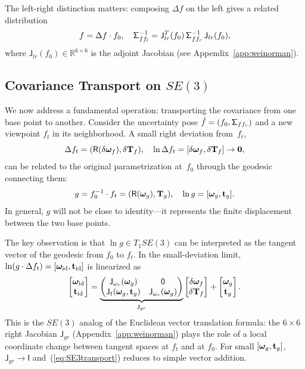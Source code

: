 \documentclass[journal]{IEEEtran}
\newcommand{\real}{\mathbb{R}}
\newcommand{\bfomega}{\boldsymbol{\omega}}
\newcommand{\sfSigma}[1]{\mathsf{\Sigma}_\mathnormal{#1}}
\newcommand{\beq}{\begin{equation}}
\newcommand{\eeq}{\end{equation}}
\begin{document}
The left-right distinction matters: composing 
$\Delta f$ on the left gives a related distribution
\beq
    f = \Delta f \cdot f_0,\quad
    \sfSigma{ff_l}^{-1} = \mathsf{J}_{lr}^T(f_0)\,
    \sfSigma{ff_r}^{-1}\, \mathsf{J}_{lr}(f_0),
    \label{eq:leftright}
\eeq
where $\mathsf{J}_{lr}(f_0) \in \real^{6 \times 6}$ is the 
adjoint Jacobian (see Appendix~\ref{app:weinorman}).

\subsection{Covariance Transport on $SE(3)$}
\label{subsec:covtransport}

We now address a fundamental operation: transporting
the covariance from one base point to another.
Consider the uncertainty pose $\hat{f} = (f_0, \sfSigma{ff_r})$
and a new viewpoint $f_t$ in its neighborhood.
A small right deviation from~$f_t$,
\beq
    \Delta f_t = (\mathsf{R}(\delta\bfomega_f), \delta{\bf T}_f),
    \quad \ln\Delta f_t = [\delta\bfomega_f, \delta{\bf T}_f] \to {\bf 0},
    \label{eq:rightdeviation}
\eeq
can be related to the original parametrization at~$f_0$
through the geodesic connecting them:
\beq
    g = f_0^{-1} \cdot f_t = (\mathsf{R}(\bfomega_g), {\bf T}_g),
    \quad \ln g = [\bfomega_g, {\bf t}_g].
    \label{eq:geodesic}
\eeq
In general, $g$ will not be close to identity---it represents
the finite displacement between the two base points.

The key observation is that $\ln g \in T_1SE(3)$ can be
interpreted as the tangent vector of the geodesic from $f_0$
to $f_t$. In the small-deviation limit,
$\ln(g \cdot \Delta f_t) = [\bfomega_{\rm id}, {\bf t}_{\rm id}]$
is linearized as
\beq
    \begin{bmatrix} \bfomega_{\rm id} \\ {\bf t}_{\rm id} \end{bmatrix}
    = \underbrace{\begin{pmatrix}
    \mathsf{J}_{\omega_r}(\bfomega_g) & \mathsf{0} \\
    \mathsf{J}_t(\bfomega_g, {\bf t}_g) & \mathsf{J}_{\omega_r}(\bfomega_g)
    \end{pmatrix}}_{\mathsf{J}_{gr}}
    \begin{bmatrix} \delta\bfomega_f \\ \delta{\bf T}_f \end{bmatrix}
    + \begin{bmatrix} \bfomega_g \\ {\bf t}_g \end{bmatrix}.
    \label{eq:SE3transport}
\eeq
This is the $SE(3)$ analog of the Euclidean vector translation
formula: the $6\times 6$ right Jacobian $\mathsf{J}_{gr}$
(Appendix~\ref{app:weinorman}) plays the role of a local
coordinate change between tangent spaces at $f_t$ and at $f_0$.
For small $[\bfomega_g, {\bf t}_g]$, $\mathsf{J}_{gr} \to \mathsf{I}$
and~(\ref{eq:SE3transport}) reduces to simple vector addition.
\end{document}
